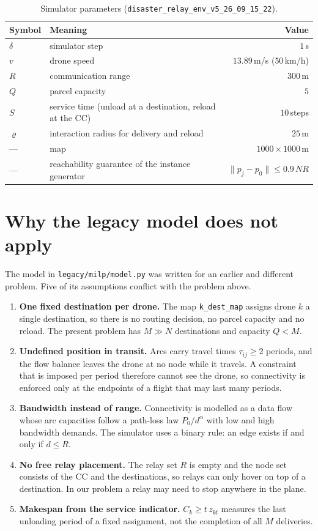 \documentclass[11pt]{article}
\begin{document}
\begin{table}[h]
\centering
\caption{Simulator parameters (\texttt{disaster\_relay\_env\_v5\_26\_09\_15\_22}).}
\label{tab:param}
\begin{tabular}{llr}
\toprule
Symbol & Meaning & Value \\
\midrule
$\delta$ & simulator step & $1$\,s \\
$v$ & drone speed & $13.89$\,m/s ($50$\,km/h) \\
$R$ & communication range & $300$\,m \\
$Q$ & parcel capacity & $5$ \\
$S$ & service time (unload at a destination, reload at the CC) & $10$\,steps \\
$\varrho$ & interaction radius for delivery and reload & $25$\,m \\
--- & map & $1000 \times 1000$\,m \\
--- & reachability guarantee of the instance generator & $\|p_j - p_0\| \le 0.9\,N R$ \\
\bottomrule
\end{tabular}
\end{table}

\section{Why the legacy model does not apply}

The model in \texttt{legacy/milp/model.py} was written for an earlier and different problem.
Five of its assumptions conflict with the problem above.

\begin{enumerate}
\item \textbf{One fixed destination per drone.} The map \texttt{k\_dest\_map} assigns drone
$k$ a single destination, so there is no routing decision, no parcel capacity and no reload.
The present problem has $M \gg N$ destinations and capacity $Q < M$.
\item \textbf{Undefined position in transit.} Arcs carry travel times $\tau_{ij} \ge 2$
periods, and the flow balance leaves the drone at no node while it travels. A constraint
that is imposed per period therefore cannot see the drone, so connectivity is enforced only
at the endpoints of a flight that may last many periods.
\item \textbf{Bandwidth instead of range.} Connectivity is modelled as a data flow whose arc
capacities follow a path-loss law $P_0/d^{\alpha}$ with low and high bandwidth demands. The
simulator uses a binary rule: an edge exists if and only if $d \le R$.
\item \textbf{No free relay placement.} The relay set $R$ is empty and the node set consists
of the CC and the destinations, so relays can only hover on top of a destination. In our
problem a relay may need to stop anywhere in the plane.
\item \textbf{Makespan from the service indicator.} $C_k \ge t\,z_{kt}$ measures the last
unloading period of a fixed assignment, not the completion of all $M$ deliveries.
\end{enumerate}
\end{document}
